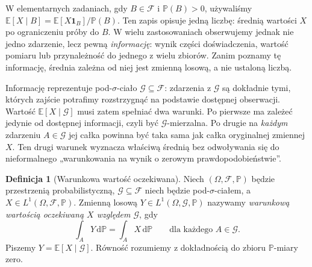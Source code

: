 \documentclass[11pt,a4paper,oneside]{report}
\numberwithin{equation}{chapter}
\theoremstyle{plain}
\theoremstyle{definition}
\newtheorem{definicja}{Definicja}[chapter]
\theoremstyle{remark}
\newcommand{\Prob}{\mathbb{P}}
\newcommand{\E}{\mathbb{E}}
\newcommand{\ind}[1]{\mathbf{1}_{#1}}
\newcommand{\dd}{\mathrm{d}}
\begin{document}
W elementarnych zadaniach, gdy $B\in\mathcal F$ i
$\Prob(B)>0$, używaliśmy
$\E[X\mid B]=\E[X\ind B]/\Prob(B)$.
Ten zapis opisuje jedną liczbę: średnią wartości $X$
po ograniczeniu próby do $B$. W wielu zastosowaniach
obserwujemy jednak nie jedno zdarzenie, lecz pewną
\emph{informację}: wynik części doświadczenia, wartość
pomiaru lub przynależność do jednego z wielu zbiorów.
Zanim poznamy tę informację, średnia zależna od niej
jest zmienną losową, a nie ustaloną liczbą.

Informację reprezentuje pod-$\sigma$-ciało
$\mathcal G\subseteq\mathcal F$: zdarzenia z
$\mathcal G$ są dokładnie tymi, których zajście
potrafimy rozstrzygnąć na podstawie dostępnej obserwacji.
Wartość $\E[X\mid\mathcal G]$ musi zatem
spełniać dwa warunki. Po pierwsze ma zależeć jedynie
od dostępnej informacji, czyli być
$\mathcal G$-mierzalna. Po drugie na \emph{każdym}
zdarzeniu $A\in\mathcal G$ jej całka powinna być
taka sama jak całka oryginalnej zmiennej $X$.
Ten drugi warunek wyznacza właściwą średnią bez
odwoływania się do nieformalnego „warunkowania
na wynik o zerowym prawdopodobieństwie”.

\begin{definicja}[Warunkowa wartość oczekiwana]
Niech $(\Omega,\mathcal F,\Prob)$ będzie przestrzenią
probabilistyczną, $\mathcal G\subseteq\mathcal F$
niech będzie pod-$\sigma$-ciałem, a $X\in L^1(\Omega,
\mathcal F,\Prob)$. Zmienną losową
$Y\in L^1(\Omega,\mathcal G,\Prob)$ nazywamy
\emph{warunkową wartością oczekiwaną $X$ względem
$\mathcal G$}, gdy
\[
\int_A Y\,\dd\Prob=\int_A X\,\dd\Prob
\qquad\text{dla każdego }A\in\mathcal G.
\]
Piszemy $Y=\E[X\mid\mathcal G]$.
Równość rozumiemy z dokładnością do zbioru
$\Prob$-miary zero.
\end{definicja}
\end{document}
